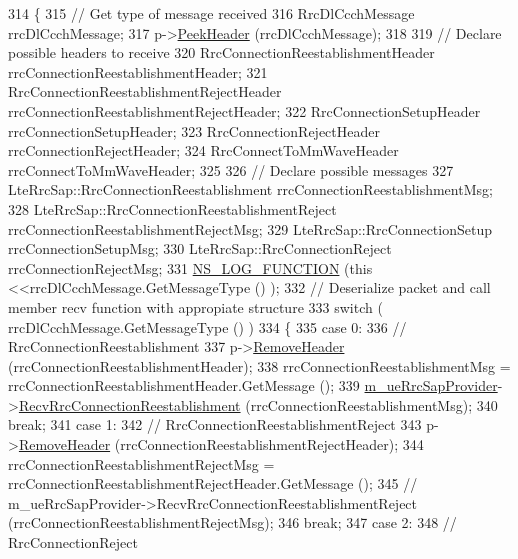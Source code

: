 \begin{DoxyCode}
314 \{
315   \textcolor{comment}{// Get type of message received}
316   RrcDlCcchMessage rrcDlCcchMessage;
317   p->\hyperlink{classns3_1_1Packet_aadc63487bea70945c418f4c3e9b81964}{PeekHeader} (rrcDlCcchMessage);
318 
319   \textcolor{comment}{// Declare possible headers to receive}
320   RrcConnectionReestablishmentHeader rrcConnectionReestablishmentHeader;
321   RrcConnectionReestablishmentRejectHeader rrcConnectionReestablishmentRejectHeader;
322   RrcConnectionSetupHeader rrcConnectionSetupHeader;
323   RrcConnectionRejectHeader rrcConnectionRejectHeader;
324   RrcConnectToMmWaveHeader rrcConnectToMmWaveHeader;
325 
326   \textcolor{comment}{// Declare possible messages}
327   LteRrcSap::RrcConnectionReestablishment rrcConnectionReestablishmentMsg;
328   LteRrcSap::RrcConnectionReestablishmentReject rrcConnectionReestablishmentRejectMsg;
329   LteRrcSap::RrcConnectionSetup rrcConnectionSetupMsg;
330   LteRrcSap::RrcConnectionReject rrcConnectionRejectMsg;
331   \hyperlink{log-macros-disabled_8h_a90b90d5bad1f39cb1b64923ea94c0761}{NS\_LOG\_FUNCTION} (\textcolor{keyword}{this} <<rrcDlCcchMessage.GetMessageType () );
332   \textcolor{comment}{// Deserialize packet and call member recv function with appropiate structure}
333   \textcolor{keywordflow}{switch} ( rrcDlCcchMessage.GetMessageType () )
334     \{
335     \textcolor{keywordflow}{case} 0:
336       \textcolor{comment}{// RrcConnectionReestablishment}
337       p->\hyperlink{classns3_1_1Packet_a0961eccf975d75f902d40956c93ba63e}{RemoveHeader} (rrcConnectionReestablishmentHeader);
338       rrcConnectionReestablishmentMsg = rrcConnectionReestablishmentHeader.GetMessage ();
339       \hyperlink{classns3_1_1LteUeRrcProtocolReal_a1d594fbb2755388a84d4d1d53298b0f8}{m\_ueRrcSapProvider}->\hyperlink{classns3_1_1LteUeRrcSapProvider_ad9a7cb57c2dda4aade5d2a6a1f36c414}{RecvRrcConnectionReestablishment}
       (rrcConnectionReestablishmentMsg);
340       \textcolor{keywordflow}{break};
341     \textcolor{keywordflow}{case} 1:
342       \textcolor{comment}{// RrcConnectionReestablishmentReject}
343       p->\hyperlink{classns3_1_1Packet_a0961eccf975d75f902d40956c93ba63e}{RemoveHeader} (rrcConnectionReestablishmentRejectHeader);
344       rrcConnectionReestablishmentRejectMsg = rrcConnectionReestablishmentRejectHeader.GetMessage ();
345       \textcolor{comment}{// m\_ueRrcSapProvider->RecvRrcConnectionReestablishmentReject
       (rrcConnectionReestablishmentRejectMsg);}
346       \textcolor{keywordflow}{break};
347     \textcolor{keywordflow}{case} 2:
348       \textcolor{comment}{// RrcConnectionReject}

\end{DoxyCode}
